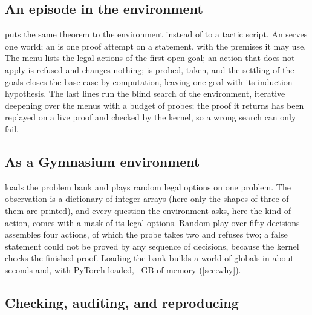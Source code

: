 \subsection{An episode in the environment}\label{sec:use-env}

 puts the same theorem to the environment instead of to a tactic script.
An  serves one world; an  is one proof attempt on a statement, with the premises it may use.
The menu lists the legal actions of the first open goal; an action that does not apply is refused and changes nothing;  is probed, taken, and the settling of the goals closes the base case by computation, leaving one goal with its induction hypothesis.
The last lines run the blind search of the environment, iterative deepening over the menus with a budget of probes; the proof it returns has been replayed on a live proof and checked by the kernel, so a wrong search can only fail.



\subsection{As a Gymnasium environment}\label{sec:use-gym}

 loads the problem bank and plays random legal options on one problem.
The observation is a dictionary of integer arrays (here only the shapes of three of them are printed), and every question the environment asks, here the kind of action, comes with a mask of its legal options.
Random play over fifty decisions assembles four actions, of which the probe takes two and refuses two; a false statement could not be proved by any sequence of decisions, because the kernel checks the finished proof.
Loading the bank builds a world of \bankGlobals{} globals in about \bankWorldSec{} seconds and, with PyTorch loaded, \bankRSSTorch{}~GB of memory (\cref{sec:why}).



\subsection{Checking, auditing, and reproducing}\label{sec:use-check}

